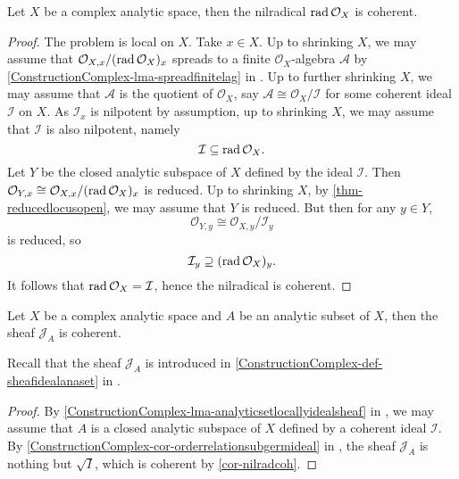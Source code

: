 \begin{corollary}\label{cor-nilradcoh}
    Let $X$ be a complex analytic space, then the nilradical $\operatorname{rad} \mathcal{O}_X$ is coherent.
\end{corollary}
\begin{proof}
    The problem is local on $X$. Take $x\in X$. Up to shrinking $X$, we may assume that $\mathcal{O}_{X,x}/(\operatorname{rad} \mathcal{O}_X)_x$ spreads to a finite $\mathcal{O}_X$-algebra $\mathcal{A}$ by \cref{ConstructionComplex-lma-spreadfinitelag} in . Up to further shrinking $X$, we may assume that $\mathcal{A}$ is the quotient of $\mathcal{O}_X$, say $\mathcal{A}\cong \mathcal{O}_X/\mathcal{I}$ for some coherent ideal $\mathcal{I}$ on $X$. As $\mathcal{I}_x$ is nilpotent by assumption, up to shrinking $X$, we may assume that $\mathcal{I}$ is also nilpotent, namely
    \[
        \mathcal{I}\subseteq  \operatorname{rad} \mathcal{O}_X. 
    \]
    Let $Y$ be the closed analytic subspace of $X$ defined by the ideal $\mathcal{I}$. Then $\mathcal{O}_{Y,x}\cong \mathcal{O}_{X,x}/(\operatorname{rad} \mathcal{O}_X)_x$ is reduced. Up to shrinking $X$, by \cref{thm-reducedlocusopen}, we may assume that $Y$ is reduced. But then for any $y\in Y$, 
    \[
        \mathcal{O}_{Y,y}\cong \mathcal{O}_{X,y}/\mathcal{I}_y
    \]
    is reduced, so
    \[
        \mathcal{I}_y\supseteq   (\operatorname{rad} \mathcal{O}_X)_y.
    \] 
    It follows that $\operatorname{rad} \mathcal{O}_X=\mathcal{I}$, hence the nilradical is coherent.
\end{proof}

\begin{corollary}\label{cor-CartanOka}
    Let $X$ be a complex analytic space and $A$ be an analytic subset of $X$, then the sheaf $\mathcal{J}_A$ is coherent.
\end{corollary}
Recall that the sheaf $\mathcal{J}_A$ is introduced in \cref{ConstructionComplex-def-sheafidealanaset} in .
\begin{proof}
By   \cref{ConstructionComplex-lma-analyticsetlocallyidealsheaf} in , we may assume that $A$ is a closed analytic subspace of $X$ defined by a coherent ideal $\mathcal{I}$. By \cref{ConstructionComplex-cor-orderrelationsubgermideal} in , the sheaf $\mathcal{J}_A$ is nothing but $\sqrt{I}$, which is coherent by \cref{cor-nilradcoh}.
\end{proof}

